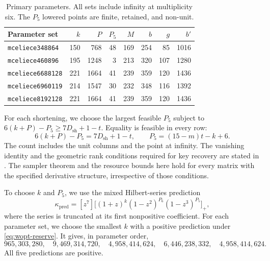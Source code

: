 \documentclass[b5paper, 10pt, abstract=true, captions=tableheading]{scrartcl}
\theoremstyle{plain}
\theoremstyle{definition}
\begin{document}
\begin{table}[htbp]
\centering\small\setlength{\tabcolsep}{4pt}
\caption{Primary parameters. All sets include infinity at multiplicity
six. The \(P_5\) lowered points are finite, retained, and non-unit.}
\label{tab:wopt-parameters}
\begin{tabular}{@{}lrrrrrrr@{}}
\toprule Parameter set & \(k\) & \(P\) & \(P_5\) & \(M\) & \(b\) & \(g\) & \(b'\)\\
\midrule
\texttt{mceliece348864} & 150 & 768 & 48 & 169 & 254 & 85 & 1016 \\
\texttt{mceliece460896} & 195 & 1248 & 3 & 213 & 320 & 107 & 1280 \\
\texttt{mceliece6688128} & 221 & 1664 & 41 & 239 & 359 & 120 & 1436 \\
\texttt{mceliece6960119} & 214 & 1547 & 30 & 232 & 348 & 116 & 1392 \\
\texttt{mceliece8192128} & 221 & 1664 & 41 & 239 & 359 & 120 & 1436 \\
\bottomrule
\end{tabular}
\end{table}

For each shortening, we choose the largest feasible $P_5$ subject to
$6(k+P)-P_5\geq7D_{\mathrm{sh}}+1-t$. Equality is feasible in every row:
\begin{equation}
 6(k+P)-P_5=7D_{\mathrm{sh}}+1-t,
 \qquad P_5=(15-m)t-k+6.
 \label{eq:wopt-reserve}
\end{equation}
The count includes the unit columns and the point at infinity. The
vanishing identity and the geometric rank conditions required for key
recovery are stated in \cite[Sec.~9]{Vedenev2026KeyRecovery}.
The sampler theorem and the resource bounds here hold for every matrix
with the specified derivative structure, irrespective of those conditions.

To choose $k$ and $P_5$, we use the mixed Hilbert-series prediction
\begin{equation}
 \kappa_{\mathrm{pred}}=[z^7]\bigl[(1+z)^k
             (1-z^2)^{P_6}(1-z^3)^{P_5}\bigr]_+,
 \label{eq:wopt-hilbert}
\end{equation}
where the series is truncated at its first nonpositive coefficient.
For each parameter set, we choose the smallest $k$ with a positive
prediction under \eqref{eq:wopt-reserve}. It gives, in parameter order,
\[
 965{,}303{,}280,\quad 9{,}469{,}314{,}720,\quad
 4{,}958{,}414{,}624,\quad 6{,}446{,}238{,}332,\quad 4{,}958{,}414{,}624.
\]
All five predictions are positive.
\end{document}
